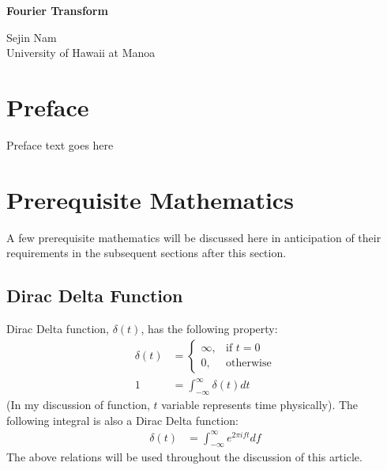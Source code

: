 \documentclass[letterpaper, 11pt]{article}
\newcommand{\fint}{\int_{-\infty}^{\infty}} %
\newcommand{\ift}[2]{\fint #2 e^{2\pi i#1t} d#1} %
\numberwithin{equation}{section}
\numberwithin{figure}{section}
\begin{document}
\begin{titlepage}
	\begin{center}
		\Huge{\bfseries Fourier Transform}\vfill 
	\end{center}

	\begin{flushright}
		Sejin Nam\\
		University of Hawaii at Manoa
	\end{flushright}
\end{titlepage}

\section*{\centering Preface}
Preface text goes here
\cleardoublepage

\tableofcontents
\clearpage

\pagestyle{fancy}

\section{Prerequisite Mathematics}
A few prerequisite mathematics will be discussed here in anticipation of their requirements in the subsequent sections after this section. 

\subsection{Dirac Delta Function}
Dirac Delta function, \(\delta (t)\), has the following property:
\begin{align}
	\delta (t)	&=\begin{cases}
		\infty, & \text{if } t = 0 \\
		0,	& \text{otherwise}
	\end{cases}\\
		1	&= \fint \delta (t) dt
\end{align}
(In my discussion of function, \(t\) variable represents time physically). The following integral is also a Dirac Delta function:
\begin{align}
	\delta (t)	&= \ift{f}{}\label{eq:dirac}
\end{align}
The above relations will be used throughout the discussion of this article.
\end{document}
